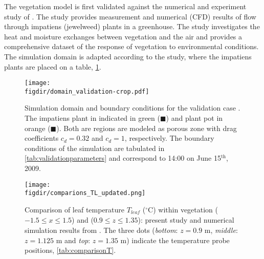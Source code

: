 The vegetation model is first validated against the numerical and experiment study of \cite{Kichah2012}. The study provides measurement and numerical (CFD) results of flow through impatiens (jewelweed) plants in a greenhouse. The study investigates the heat and moisture exchanges between vegetation and the air and provides a comprehensive dataset of the response of vegetation to environmental conditions. The simulation domain is adapted according to the study, where the impatiens plants are placed on a table, \cref{fig:domain_validation}.

	\begin{figure}[t]
		\centering
		\texttt{[image: \\figdir/domain\_validation-crop.pdf]}
		\caption{Simulation domain and boundary conditions for the validation case \cite{Kichah2012}. The impatiens plant in indicated in green ({\color{flatuidarkgreen}$\blacksquare$}) and plant pot in orange ({\color{flatuiorange}$\blacksquare$}). Both are regions are modeled as porous zone with drag coefficients $c_d=0.32$ and $c_d=1$, respectively. The boundary conditions of the simulation are tabulated in \cref{tab:validationparameters} and correspond to 14:00 on June 15$^{\mathrm{th}}$, 2009.}
		\label{fig:domain_validation}
	\end{figure}

	\begin{figure}[p]
	\centering
	\texttt{[image: \\figdir/comparions\_TL\_updated.png]}
	\caption{Comparison of leaf temperature $T_\mathit{leaf}$ ($^{\circ}$C) within vegetation ($-1.5\le x \le 1.5$) and ($0.9 \le z \le 1.35$):  present study and  numerical simulation results from \citep{Kichah2012}. The three dots (\textit{bottom}: $z=0.9$ m, \textit{middle}: $z=1.125$ m and \textit{top}: $z=1.35$ m) indicate the temperature probe positions, \cref{tab:comparisonT}.}
	\label{fig:comparions_TL_updated}
\end{figure}


